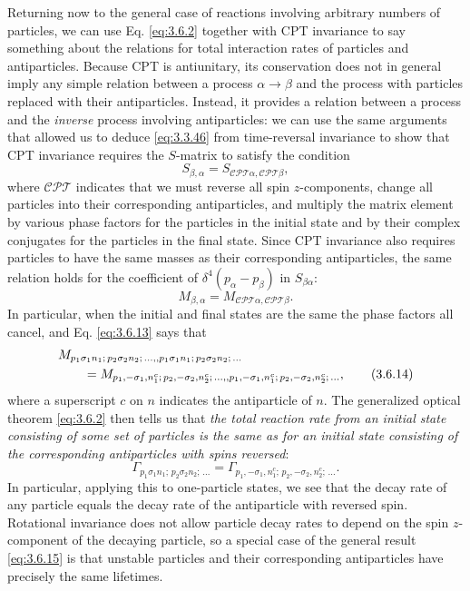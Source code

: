 Returning now to the general case of reactions involving arbitrary numbers of particles, we can
use Eq. \eqref{eq:3.6.2} together with CPT invariance to say something about the relations for total
interaction rates of particles and antiparticles. Because CPT is antiunitary, its conservation
does not in general imply any simple relation between a process $\alpha\to\beta$ and the process
with particles replaced with their antiparticles. Instead, it provides a relation between a
process and the \emph{inverse} process involving antiparticles: we can use the same arguments that
allowed us to deduce \eqref{eq:3.3.46} from time-reversal invariance to show that CPT invariance requires
the $S$-matrix to satisfy the condition
\begin{equation}
 S_{\beta,\alpha}=S_{\mathcal{CPT}\alpha,\mathcal{CPT}\beta},
 \tag{3.6.12}\label{eq:3.6.12}
\end{equation}
where $\mathcal{CPT}$ indicates that we must reverse all spin $z$-components, change all particles
into their corresponding antiparticles, and multiply the matrix element by various phase factors
for the particles in the initial state and by their complex conjugates for the particles in the
final state. Since CPT invariance also requires particles to have the same masses as their
corresponding antiparticles, the same relation holds for the coefficient of
$\delta^4(p_\alpha-p_\beta)$ in $S_{\beta\alpha}$:
\begin{equation}
 M_{\beta,\alpha}=M_{\mathcal{CPT}\alpha,\mathcal{CPT}\beta}.
 \tag{3.6.13}\label{eq:3.6.13}
\end{equation}
In particular, when the initial and final states are the same the phase factors all cancel, and
Eq. \eqref{eq:3.6.13} says that
\begin{align}
 &M_{p_1\sigma_1n_1;\,p_2\sigma_2n_2;\,\ldots,,
 p_1\sigma_1n_1;\,p_2\sigma_2n_2;\,\ldots}\notag\\
 &\qquad=M_{p_1,-\sigma_1,n_1^c;\,p_2,-\sigma_2,n_2^c;\,\ldots,,
 p_1,-\sigma_1,n_1^c;\,p_2,-\sigma_2,n_2^c;\,\ldots},
 \tag{3.6.14}\label{eq:3.6.14}
\end{align}
where a superscript $c$ on $n$ indicates the antiparticle of $n$. The generalized optical theorem
\eqref{eq:3.6.2} then tells us that \emph{the total reaction rate from an initial state consisting of some
set of particles is the same as for an initial state consisting of the corresponding antiparticles
with spins reversed}:
\begin{equation}
 \Gamma_{p_1\sigma_1n_1;\,p_2\sigma_2n_2;\,\ldots}
 =\Gamma_{p_1,-\sigma_1,n_1^c;\,p_2,-\sigma_2,n_2^c;\,\ldots}.
 \tag{3.6.15}\label{eq:3.6.15}
\end{equation}
In particular, applying this to one-particle states, we see that the decay rate of any particle
equals the decay rate of the antiparticle with reversed spin. Rotational invariance does not allow
particle decay rates to depend on the spin $z$-component of the decaying particle, so a special
case of the general result \eqref{eq:3.6.15} is that unstable particles and their corresponding antiparticles
have precisely the same lifetimes.

